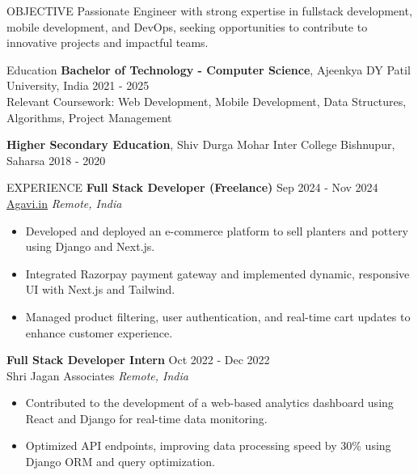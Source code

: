 \documentclass{style} %
\begin{document}

\begin{rSection}{OBJECTIVE}
{Passionate Engineer with strong expertise in fullstack development, mobile development, and DevOps, seeking opportunities to contribute to innovative projects and impactful teams.}
\end{rSection}


\begin{rSection}{Education}
{\bf Bachelor of Technology - Computer Science}, Ajeenkya DY Patil University, India \hfill {2021 - 2025}\\
Relevant Coursework: Web Development, Mobile Development, Data Structures, Algorithms, Project Management

\vspace{0.5em} %

{\bf Higher Secondary Education}, Shiv Durga Mohar Inter College Bishnupur, Saharsa \hfill {2018 - 2020}
\end{rSection}



\begin{rSection}{EXPERIENCE}
\textbf{Full Stack Developer (Freelance)} \hfill Sep 2024 - Nov 2024\\
\href{https://agavi.in}{Agavi.in} \hfill \textit{Remote, India}
 \begin{itemize}
    \itemsep -3pt {} 
     \item Developed and deployed an e-commerce platform to sell planters and pottery using Django and Next.js.
     \item Integrated Razorpay payment gateway and implemented dynamic, responsive UI with Next.js and Tailwind.
     \item Managed product filtering, user authentication, and real-time cart updates to enhance customer experience.
 \end{itemize}
 
\textbf{Full Stack Developer Intern} \hfill Oct 2022 - Dec 2022\\
Shri Jagan Associates \hfill \textit{Remote, India}
 \begin{itemize}
    \itemsep -3pt {} 
     \item Contributed to the development of a web-based analytics dashboard using React and Django for real-time data monitoring.
     \item Optimized API endpoints, improving data processing speed by 30\% using Django ORM and query optimization.
 \end{itemize}
\end{rSection} 
\end{document}
